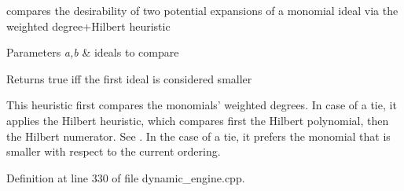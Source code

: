 compares the desirability of two potential expansions of a monomial ideal via the weighted degree+\+Hilbert heuristic 


\begin{DoxyParams}{Parameters}
{\em a,b} & ideals to compare \\
\hline
\end{DoxyParams}
\begin{DoxyReturn}{Returns}
{\ttfamily true} iff the first ideal is considered smaller
\end{DoxyReturn}
This heuristic first compares the monomials' weighted degrees. In case of a tie, it applies the Hilbert heuristic, which compares first the Hilbert polynomial, then the Hilbert numerator. See \cite{CaboaraDynAlg}. In the case of a tie, it prefers the monomial that is smaller with respect to the current ordering. 

Definition at line 330 of file dynamic\+\_\+engine.\+cpp.

